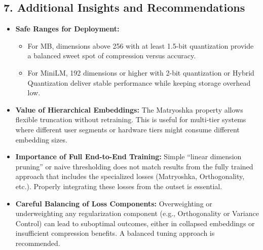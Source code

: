 \documentclass{article}
\begin{document}
\subsection*{7. Additional Insights and Recommendations}
\begin{itemize}
    \item \textbf{Safe Ranges for Deployment:} 
    \begin{itemize}
        \item For MB, dimensions above 256 with at least 1.5-bit quantization provide a balanced sweet spot of compression versus accuracy.
        \item For MiniLM, 192 dimensions or higher with 2-bit quantization or Hybrid Quantization deliver stable performance while keeping storage overhead low.
    \end{itemize}
    \item \textbf{Value of Hierarchical Embeddings:} The Matryoshka property allows flexible truncation without retraining. This is useful for multi-tier systems where different user segments or hardware tiers might consume different embedding sizes.
    \item \textbf{Importance of Full End-to-End Training:} Simple “linear dimension pruning” or naive thresholding does not match results from the fully trained approach that includes the specialized losses (Matryoshka, Orthogonality, etc.). Properly integrating these losses from the outset is essential.
    \item \textbf{Careful Balancing of Loss Components:} Overweighting or underweighting any regularization component (e.g., Orthogonality or Variance Control) can lead to suboptimal outcomes, either in collapsed embeddings or insufficient compression benefits. A balanced tuning approach is recommended.
\end{itemize}
\end{document}
